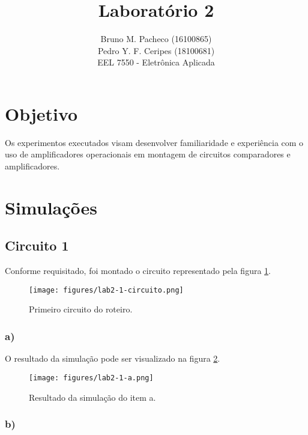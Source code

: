 \documentclass[a4paper]{report}
\begin{document}
 
\title{Laboratório 2}
\author{Bruno M. Pacheco (16100865)\\
Pedro Y. F. Ceripes (18100681) \\
EEL 7550 - Eletrônica Aplicada}
 
\maketitle

\section*{Objetivo}
 
Os experimentos executados visam desenvolver familiaridade e experiência com o uso de amplificadores operacionais em montagem de circuitos comparadores e amplificadores.
 
\section*{Simulações}

\subsection*{Circuito 1}

Conforme requisitado, foi montado o circuito representado pela figura \ref{fig:figures-lab2-1-circuito-png}.

\begin{figure}[H]
    \centering
    \texttt{[image: figures/lab2-1-circuito.png]}
    \caption{Primeiro circuito do roteiro.}
    \label{fig:figures-lab2-1-circuito-png}
\end{figure}

\subsubsection*{a)}

O resultado da simulação pode ser visualizado na figura \ref{fig:figures-lab2-1-a-png}.

\begin{figure}[H]
    \centering
    \texttt{[image: figures/lab2-1-a.png]}
    \caption{Resultado da simulação do item a.}
    \label{fig:figures-lab2-1-a-png}
\end{figure}

\subsubsection*{b)}
\end{document}

